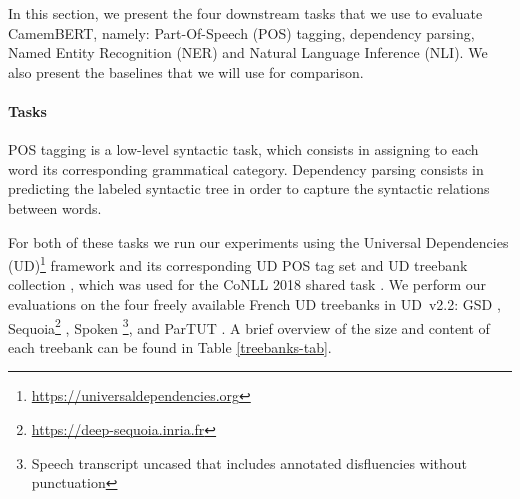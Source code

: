 \documentclass[11pt,a4paper]{article}
\newcommand{\camembert}{CamemBERT\xspace}
\begin{document}
In this section, we present the four downstream tasks that we use to evaluate \camembert, namely: Part-Of-Speech (POS) tagging, dependency parsing, Named Entity Recognition (NER) and Natural Language Inference (NLI). We also present the baselines that we will use for comparison.


\paragraph{Tasks} POS tagging is a low-level syntactic task, which consists in assigning to each word its corresponding grammatical category. Dependency parsing consists in predicting the labeled syntactic tree in order to capture the syntactic relations between words.

For both of these tasks we run our experiments using the Universal Dependencies (UD)\footnote{\url{https://universaldependencies.org}} framework and its corresponding UD POS tag set \citep{petrov2011universal} and UD treebank collection \citep{ud22}, which was used for the CoNLL 2018 shared task \citep{seker2018universal}. We perform our evaluations on the four freely available French UD treebanks in UD~v2.2: GSD \citep{mcdonald13}, Sequoia\footnote{\url{https://deep-sequoia.inria.fr}} \citep{candito2012le,candito2014deep}, Spoken \citep{lacheret14,bawden14}\footnote{Speech transcript uncased that includes annotated disfluencies without punctuation}, and ParTUT \cite{sanguinetti2015PartTUT}. A brief overview of the size and content of each treebank can be found in Table \ref{treebanks-tab}.

\begin{table}[ht]
\centering\small
{}
\caption{Statistics on the treebanks used in POS tagging, dependency parsing, and NER (FTB).}\label{treebanks-tab}
\end{table}
\end{document}
